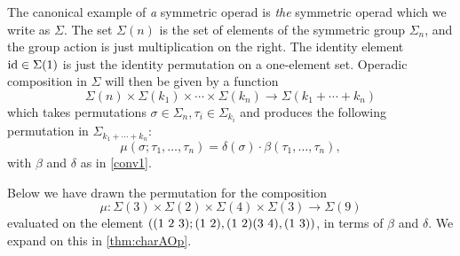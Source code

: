 \begin{example}\label{exSigma}
The canonical example of \emph{a} symmetric operad is \emph{the} symmetric operad which we write as $\Sigma$. The set $\Sigma(n)$ is the set of elements of the symmetric group $\Sigma_{n}$, and the group action is just multiplication on the right. The identity element $\textrm{id} \in \Sigma(1)$ is just the identity permutation on a one-element set. Operadic composition in $\Sigma$ will then be given by a function
  \[
    \Sigma(n) \times \Sigma(k_{1}) \times \cdots \times \Sigma(k_{n}) \rightarrow \Sigma(k_{1} + \cdots + k_{n})
  \]
which takes permutations $\sigma \in \Sigma_{n}, \tau_{i} \in \Sigma_{k_{i}}$ and produces the following permutation in $\Sigma_{k_{1} + \cdots + k_{n}}$:
  \[
    \mu(\sigma; \tau_{1}, \ldots, \tau_{n}) = \delta(\sigma) \cdot \beta(\tau_1,\ldots,\tau_n),
  \]
with $\beta$ and $\delta$ as in \cref{conv1}.

Below we have drawn the permutation for the composition
  \[
    \mu \colon \Sigma(3) \times \Sigma(2) \times \Sigma(4) \times \Sigma(3) \rightarrow \Sigma(9)
  \]
evaluated on the element $\left( (1 \,\, 2 \,\, 3); ( 1 \, \, 2 ),( 1 \, \, 2 )( 3 \, \, 4 ),( 1 \, \, 3 ) \right)$, in terms of $\beta$ and $\delta$. We expand on this in \cref{thm:charAOp}.
  \begin{center}
  \end{center}
  

\end{example}
